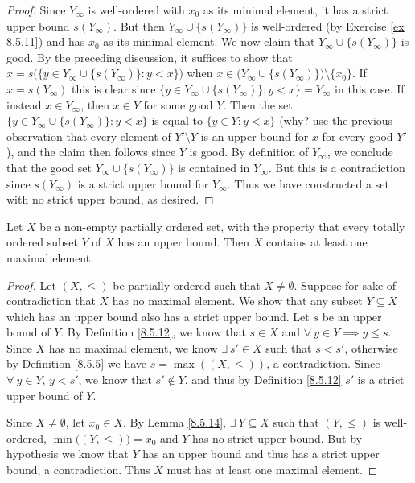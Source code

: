 \begin{proof}
    Since \(Y_{\infty}\) is well-ordered with \(x_0\) as its minimal element, it has a strict upper bound \(s(Y_{\infty})\).
    But then \(Y_{\infty} \cup \{s(Y_{\infty})\}\) is well-ordered (by Exercise \ref{ex 8.5.11}) and has \(x_0\) as its minimal element.
    We now claim that \(Y_{\infty} \cup \{s(Y_{\infty})\}\) is good.
    By the preceding discussion, it suffices to show that \(x = s\big(\big\{y \in Y_{\infty} \cup \{s(Y_{\infty})\} : y < x\big\}\big)\) when \(x \in \big(Y_{\infty} \cup \{s(Y_{\infty})\}\big) \setminus \{x_0\}\).
    If \(x = s(Y_{\infty})\) this is clear since \(\big\{y \in Y_{\infty} \cup \{s(Y_{\infty})\} : y < x\big\} = Y_{\infty}\) in this case.
    If instead \(x \in Y_{\infty}\), then \(x \in Y\) for some good \(Y\).
    Then the set \(\big\{y \in Y_{\infty} \cup \{s(Y_{\infty})\}: y < x\big\}\) is equal to \(\{y \in Y : y < x\}\)
    (why? use the previous observation that every element of \(Y' \setminus Y\) is an upper bound for \(x\) for every good \(Y'\)), and the claim then follows since \(Y\) is good.
    By definition of \(Y_{\infty}\), we conclude that the good set \(Y_{\infty} \cup \{s(Y_{\infty})\}\) is contained in \(Y_{\infty}\).
    But this is a contradiction since \(s(Y_{\infty})\) is a strict upper bound for \(Y_{\infty}\).
    Thus we have constructed a set with no strict upper bound, as desired.
\end{proof}

\begin{lemma}\label{8.5.15}
    Let \(X\) be a non-empty partially ordered set, with the property that every totally ordered subset \(Y\) of \(X\) has an upper bound.
    Then \(X\) contains at least one maximal element.
\end{lemma}

\begin{proof}
    Let \((X, \leq)\) be partially ordered such that \(X \neq \emptyset\).
    Suppose for sake of contradiction that \(X\) has no maximal element.
    We show that any subset \(Y \subseteq X\) which has an upper bound also has a strict upper bound.
    Let \(s\) be an upper bound of \(Y\).
    By Definition \ref{8.5.12}, we know that \(s \in X\) and \(\forall\ y \in Y \implies y \leq s\).
    Since \(X\) has no maximal element, we know \(\exists\ s' \in X\) such that \(s < s'\), otherwise by Definition \ref{8.5.5} we have \(s = \max((X, \leq))\), a contradiction.
    Since \(\forall\ y \in Y\), \(y < s'\), we know that \(s' \notin Y\), and thus by Definition \ref{8.5.12} \(s'\) is a strict upper bound of \(Y\).

    Since \(X \neq \emptyset\), let \(x_0 \in X\).
    By Lemma \ref{8.5.14}, \(\exists\ Y \subseteq X\) such that \((Y, \leq)\) is well-ordered, \(\min\big((Y, \leq)\big) = x_0\) and \(Y\) has no strict upper bound.
    But by hypothesis we know that \(Y\) has an upper bound and thus has a strict upper bound, a contradiction.
    Thus \(X\) must has at least one maximal element.
\end{proof}

